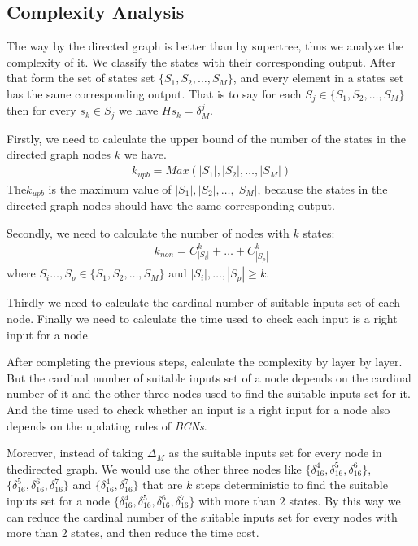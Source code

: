 \subsection{Complexity Analysis}
The way by the directed graph is better than by supertree, thus we analyze the complexity of it. We classify the states with their corresponding output. After that form the set of states set $\{S_1, S_2,\ldots,S_M\}$,  and every element in a states set has the same corresponding output. That is to say for each $S_j\in\{S_1, S_2,\ldots,S_M\}$ then for every $s_k\in S_j$ we have $Hs_k=\delta_{M}^j$.

Firstly, we need to calculate the upper bound of the number of the states in the directed graph nodes $k$ we have.
\begin{equation}
\begin{split}
k_{upb}= Max(|S_1|,|S_2|,\ldots,|S_M|)
\end{split}
\end{equation}
The$ k_{upb}$ is the maximum value of $|S_1|,|S_2|,\ldots,|S_M|$, because the states in the directed graph nodes should have the same corresponding output.

Secondly, we need to calculate the number of nodes with $k$ states:
\begin{equation}
\begin{split}
k_{non}= C_{|S_i|}^k+\ldots +C_{|S_p|}^k
\end{split}
\end{equation}
where $S_i\ldots,S_p\in\{S_1, S_2,\ldots,S_M\}$ and $|S_i|,\ldots,|S_p|\ge k$.

Thirdly we need to calculate the cardinal number of suitable inputs set of each node. Finally we need to calculate the time used to check each input is a right input for a node.

After completing the previous steps, calculate the complexity by layer by layer. But the cardinal number of suitable inputs set of a node depends on the cardinal number of it and the other three nodes used to find the suitable inputs set for it. And the time used to check whether an input is a right input for a node also depends on the updating rules of {\em BCNs}.

Moreover, instead of taking $\Delta_M$ as the suitable inputs set for every node in thedirected graph. We would use the other three nodes like $\{\delta_{16}^4,\delta_{16}^5,\delta_{16}^6\}$, $\{\delta_{16}^5,\delta_{16}^6,\delta_{16}^7\}$ and $\{\delta_{16}^4,\delta_{16}^7\}$ that are $k$ steps deterministic to find the suitable inputs set for a node $\{\delta_{16}^4,\delta_{16}^5,\delta_{16}^6,\delta_{16}^7\}$ with more than $2$ states. By this way we can  reduce the cardinal number of the suitable inputs set for every nodes with more than 2 states, and then reduce the time cost. 

